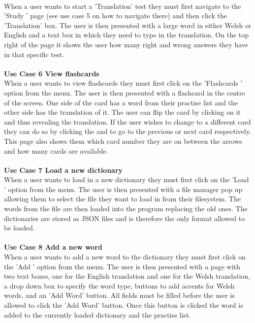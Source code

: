 \documentclass{project}
\newcommand*{\icon}[1]{%
  \raisebox{-.3\baselineskip}{%
    \texttt{[image: \#1]}%
  }%
}
\begin{document}
\\
When a user wants to start a 'Translation' test they must first navigate to the 'Study \icon{study-icon}' page (see use case 5 on how to navigate there) and then click the 'Translation' box. The user is then presented with a large word in either Welsh or English and a text box in which they need to type in the translation. On the top right of the page it shows the user how many right and wrong answers they have in that specific test.
\\\\
\textbf{Use Case 6 View flashcards}
\\
When a user wants to view flashcards they must first click on the 'Flashcards \icon{flashcard-icon}' option from the menu. The user is then presented with a flashcard in the centre of the screen. One side of the card has a word from their practise list and the other side has the translation of it. The user can flip the card by clicking on it and thus revealing the translation. If the user wishes to change to a different card they can do so by clicking the \icon{left-icon} and \icon{right-icon} to go to the previous or next card respectively. This page also shows them which card number they are on between the arrows and how many cards are available.
\\\\
\textbf{Use Case 7 Load a new dictionary}
\\
When a user wants to load in a new dictionary they must first click on the 'Load \icon{load-icon}' option from the menu. The user is then presented with a file manager pop up allowing them to select the file they want to load in from their filesystem. The words from the file are then loaded into the program replacing the old ones. The dictionaries are stored as JSON files and is therefore the only format allowed to be loaded.
\\\\
\textbf{Use Case 8 Add a new word}
\\
When a user wants to add a new word to the dictionary they must first click on the 'Add \icon{add-icon}' option from the menu. The user is then presented with a page with two text boxes, one for the English translation and one for the Welsh translation, a drop down box to specify the word type, buttons to add accents for Welsh words, and an 'Add Word' button. All fields must be filled before the user is allowed to click the 'Add Word' button. Once this button is clicked the word is added to the currently loaded dictionary and the practise list.
\end{document}
